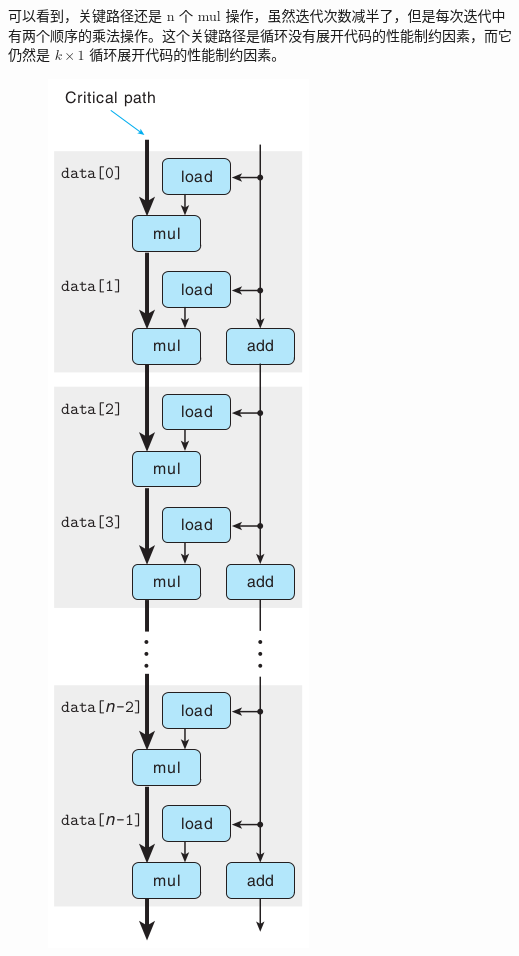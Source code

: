 可以看到，关键路径还是 n 个 mul 操作，虽然迭代次数减半了，但是每次迭代中有两个顺序的乘法操作。这个关键路径是循环没有展开代码的性能制约因素，而它仍然是 $k \times 1$ 循环展开代码的性能制约因素。

\begin{figure}[!ht]
    \centering
    \includegraphics[scale=0.5]{img/5-6}
\end{figure}
